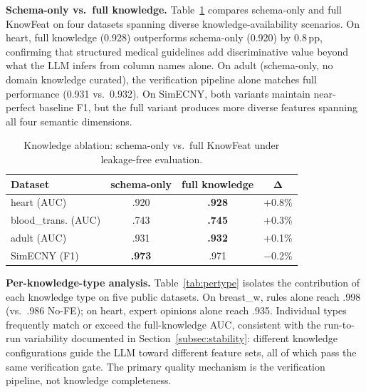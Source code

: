 \textbf{Schema-only vs.\ full knowledge.}
Table~\ref{tab:ablation} compares schema-only and full KnowFeat on four datasets spanning diverse knowledge-availability scenarios. On heart, full knowledge (0.928) outperforms schema-only (0.920) by 0.8\,pp, confirming that structured medical guidelines add discriminative value beyond what the LLM infers from column names alone. On adult (schema-only, no domain knowledge curated), the verification pipeline alone matches full performance (0.931 vs.\ 0.932). On SimECNY, both variants maintain near-perfect baseline F1, but the full variant produces more diverse features spanning all four semantic dimensions.

\begin{table}[t]
\centering
\caption{Knowledge ablation: schema-only vs.\ full KnowFeat under leakage-free evaluation.}
\label{tab:ablation}
\small
\renewcommand{\arraystretch}{1.2}
\setlength{\tabcolsep}{3pt}
\begin{tabular}{l c c c}
\hline
\textbf{Dataset} & \textbf{schema-only} & \textbf{full knowledge} & $\boldsymbol{\Delta}$ \\
\hline
heart (AUC)         & .920 & \textbf{.928} & +0.8\% \\
blood\_trans. (AUC) & .743 & \textbf{.745} & +0.3\% \\
adult (AUC)         & .931 & \textbf{.932} & +0.1\% \\
SimECNY (F1)        & \textbf{.973} & .971 & $-$0.2\% \\
\hline
\end{tabular}
\end{table}

\textbf{Per-knowledge-type analysis.}
Table~\ref{tab:pertype} isolates the contribution of each knowledge type on five public datasets. On breast\_w, rules alone reach .998 (vs.\ .986 No-FE); on heart, expert opinions alone reach .935. Individual types frequently match or exceed the full-knowledge AUC, consistent with the run-to-run variability documented in Section~\ref{subsec:stability}: different knowledge configurations guide the LLM toward different feature sets, all of which pass the same verification gate. The primary quality mechanism is the verification pipeline, not knowledge completeness.

